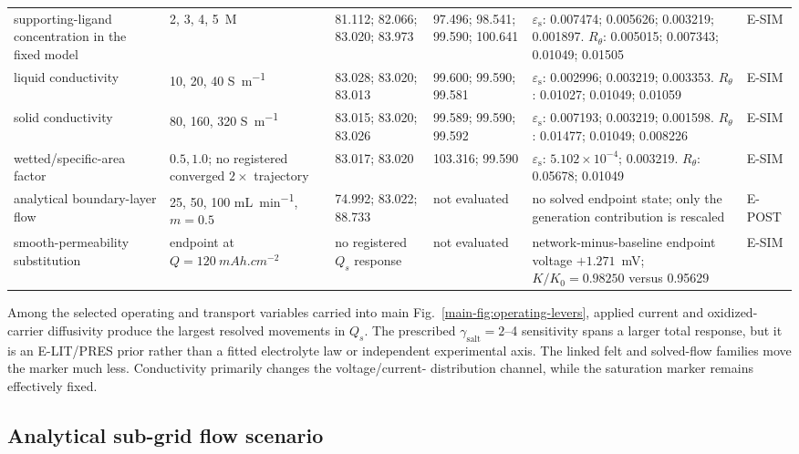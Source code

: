 \documentclass[11pt]{article}
\let\SIorigsubsection\subsection
\renewcommand{\subsection}{\FloatBarrier\SIorigsubsection}
\newcommand{\epss}{\varepsilon_{\mathrm{s}}}
\newcommand{\Rtheta}{R_{\theta}}
\newcommand{\mAhcm}{\si{mAh.cm^{-2}}}
\begin{document}
\begin{landscape}
\begin{longtable}{@{}P{2.3cm}P{2.9cm}P{4.5cm}P{4.3cm}P{5.0cm}P{1.4cm}@{}}
supporting-ligand concentration in the fixed model & 2, 3, 4, 5~M & 81.112; 82.066; 83.020; 83.973 &
97.496; 98.541; 99.590; 100.641 & $\epss$: 0.007474; 0.005626; 0.003219; 0.001897.
$\Rtheta$: 0.005015; 0.007343; 0.01049; 0.01505 & E-SIM\\
liquid conductivity & 10, 20, 40 \si{S.m^{-1}} & 83.028; 83.020; 83.013 & 99.600; 99.590; 99.581 &
$\epss$: 0.002996; 0.003219; 0.003353. $\Rtheta$: 0.01027; 0.01049; 0.01059 & E-SIM\\
solid conductivity & 80, 160, 320 \si{S.m^{-1}} & 83.015; 83.020; 83.026 & 99.589; 99.590; 99.592 &
$\epss$: 0.007193; 0.003219; 0.001598. $\Rtheta$: 0.01477; 0.01049; 0.008226 & E-SIM\\
wetted/specific-area factor & $0.5,1.0$; no registered converged $2\times$ trajectory & 83.017; 83.020 & 103.316; 99.590 &
$\epss$: $5.102\times10^{-4}$; 0.003219. $\Rtheta$: 0.05678; 0.01049 & E-SIM\\
analytical boundary-layer flow & 25, 50, 100 \si{mL.min^{-1}}, $m=0.5$ & 74.992; 83.022; 88.733 & not evaluated &
no solved endpoint state; only the generation contribution is rescaled & E-POST\\
smooth-permeability substitution & endpoint at $Q=120~\mAhcm$ & no registered $Q_s$ response & not evaluated &
network-minus-baseline endpoint voltage $+1.271$~mV; $K/K_0=0.98250$ versus 0.95629 & E-SIM\\
\bottomrule
\end{longtable}
\end{landscape}

Among the selected operating and transport variables carried into main Fig.~\ref{main-fig:operating-levers},
applied current and oxidized-carrier diffusivity produce the largest resolved movements in $Q_s$. The
prescribed $\gamma_{\mathrm{salt}}=2$--4 sensitivity spans a larger total response, but it is an
E-LIT/PRES prior rather than a fitted electrolyte law or independent experimental axis. The linked felt and
solved-flow families move the marker much less. Conductivity primarily changes the voltage/current-
distribution channel, while the saturation marker remains effectively fixed.

\subsection{Analytical sub-grid flow scenario}
\end{document}
